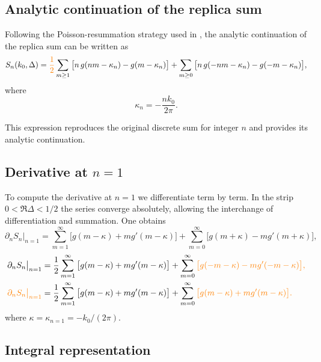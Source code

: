 \documentclass[11pt]{article}
\newcommand{\p}{\partial}
\newcommand{\nn}{\nonumber}
\newcommand{\JM}[1]{\textcolor{orange}{#1}}
\begin{document}
\subsection{Analytic continuation of the replica sum}

Following the Poisson-resummation strategy used in
\cite{calabrese2011entanglement}, the analytic continuation of the replica sum can be
written as
\begin{equation}
S_n(k_0,\Delta)=
\JM{\frac{1}{2}}\sum_{m\ge1}\big[n\,g(nm-\kappa_n)-g(m-\kappa_n)\big]
+
\sum_{m\ge0}\big[n\,g(-nm-\kappa_n)-g(-m-\kappa_n)\big],
\end{equation}
where
\begin{equation}
\kappa_n=-\frac{n k_0}{2\pi}.
\end{equation}

This expression reproduces the original discrete sum for integer $n$ and
provides its analytic continuation.

\subsection{\texorpdfstring{Derivative at $n=1$}{Derivative at n=1}}

To compute the derivative at $n=1$ we differentiate term by term.  In the
strip $0<\Re\Delta<1/2$ the series converge absolutely, allowing the
interchange of differentiation and summation.  One obtains
\begin{equation}
\partial_n S_n\big|_{n=1}=
\sum_{m=1}^\infty\big[g(m-\kappa)+m g'(m-\kappa)\big]
+
\sum_{m=0}^\infty\big[g(m+\kappa)-m g'(m+\kappa)\big],
\end{equation}
\begin{align*}
\partial_n S_n\big|_{n=1}&=\frac{1}{2}
\sum_{m=1}^\infty\big[g(m-\kappa)+m g'(m-\kappa)\big]
+
\sum_{m=0}^\infty\JM{\big[g(-m-\kappa)-m g'(-m-\kappa)\big],}  \nn \\
\JM{\p_n S_n \big|_{n=1}} &= \frac{1}{2}
\sum_{m=1}^\infty\big[g(m-\kappa)+m g'(m-\kappa)\big] + \sum_{m=0}^\infty\JM{\big[g(m-\kappa)+m g'(m-\kappa)\big].}
\end{align*}
where $\kappa=\kappa_{n=1}=-k_0/(2\pi)$.

\subsection{Integral representation}
\end{document}
